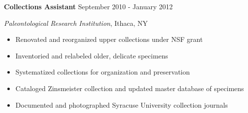 

\vspace{7pt}

\textbf{Collections Assistant} \hfill September 2010 - January 2012

\textit{Paleontological Research Institution}, Ithaca, NY

\begin{itemize}
    \item Renovated and reorganized upper collections under NSF grant
    \item Inventoried and relabeled older, delicate specimens
    \item Systematized collections for organization and preservation
    \item Cataloged Zinsmeister collection and updated master database of specimens
    \item Documented and photographed Syracuse University collection journals
\end{itemize}

